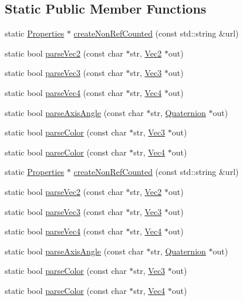 \subsection*{Static Public Member Functions}
\begin{DoxyCompactItemize}
\item 
static \hyperlink{classProperties}{Properties} $\ast$ \hyperlink{classProperties_a582e172b9f288408b79f768fddc2e77f}{create\+Non\+Ref\+Counted} (const std\+::string \&url)
\item 
static bool \hyperlink{classProperties_a9576885844b44630f266dec2e1046c50}{parse\+Vec2} (const char $\ast$str, \hyperlink{classVec2}{Vec2} $\ast$out)
\item 
static bool \hyperlink{classProperties_ac1f33c033fe980374b5fa220022312dd}{parse\+Vec3} (const char $\ast$str, \hyperlink{classVec3}{Vec3} $\ast$out)
\item 
static bool \hyperlink{classProperties_a4cd5e291bfdbbcc0d04c318ce069b571}{parse\+Vec4} (const char $\ast$str, \hyperlink{classVec4}{Vec4} $\ast$out)
\item 
static bool \hyperlink{classProperties_afd79153b542873012bc0cfc633937c68}{parse\+Axis\+Angle} (const char $\ast$str, \hyperlink{classQuaternion}{Quaternion} $\ast$out)
\item 
static bool \hyperlink{classProperties_a1624834d48cae395789b70fe444043ac}{parse\+Color} (const char $\ast$str, \hyperlink{classVec3}{Vec3} $\ast$out)
\item 
static bool \hyperlink{classProperties_af897fb4588ee9cbcf13af96c3043b380}{parse\+Color} (const char $\ast$str, \hyperlink{classVec4}{Vec4} $\ast$out)
\item 
static \hyperlink{classProperties}{Properties} $\ast$ \hyperlink{classProperties_ab9301685c24feb40541f48c1f9da6b56}{create\+Non\+Ref\+Counted} (const std\+::string \&url)
\item 
static bool \hyperlink{classProperties_ae6061fa183ad471f12164697110ace6d}{parse\+Vec2} (const char $\ast$str, \hyperlink{classVec2}{Vec2} $\ast$out)
\item 
static bool \hyperlink{classProperties_a064bfcc81174a7b25db3cae56c80294c}{parse\+Vec3} (const char $\ast$str, \hyperlink{classVec3}{Vec3} $\ast$out)
\item 
static bool \hyperlink{classProperties_a16375ad02554059ecabc57c5652cfe45}{parse\+Vec4} (const char $\ast$str, \hyperlink{classVec4}{Vec4} $\ast$out)
\item 
static bool \hyperlink{classProperties_a5dacddae83ef40b695fb23f297cdc277}{parse\+Axis\+Angle} (const char $\ast$str, \hyperlink{classQuaternion}{Quaternion} $\ast$out)
\item 
static bool \hyperlink{classProperties_a8ce9d838784b1b95087f98a27eba3500}{parse\+Color} (const char $\ast$str, \hyperlink{classVec3}{Vec3} $\ast$out)
\item 
static bool \hyperlink{classProperties_a703e785854ee11acf85f95632f6fff08}{parse\+Color} (const char $\ast$str, \hyperlink{classVec4}{Vec4} $\ast$out)
\end{DoxyCompactItemize}


